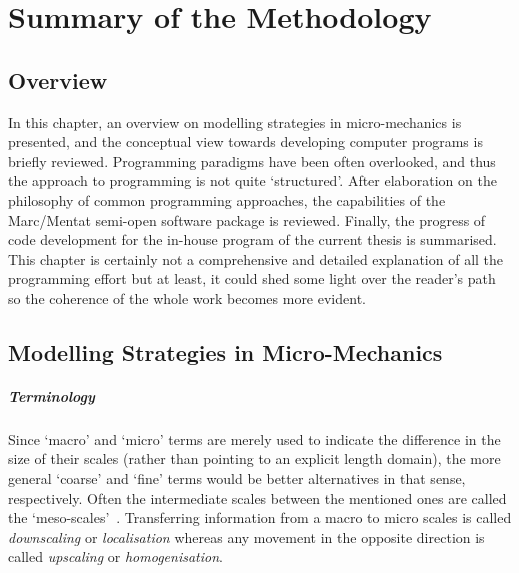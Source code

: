 
\chapter{Summary of the Methodology}\label{chap:method}
\red
\section{Overview}
	In this chapter, an overview on modelling strategies in micro-mechanics is presented, and the conceptual view towards developing computer programs is briefly reviewed. Programming paradigms have been often overlooked, and thus the approach to programming is not quite `structured'. After elaboration on the philosophy of common programming approaches, the capabilities of the Marc/Mentat semi-open software package is reviewed. Finally, the progress of code development for the in-house program of the current thesis is summarised. This chapter is certainly not a comprehensive and detailed explanation of all the programming effort but at least, it could shed some light over the reader's path so the coherence of the whole work becomes more evident.

\section{Modelling Strategies in Micro-Mechanics}
	\paragraph{Terminology} Since `macro' and `micro' terms are merely used to indicate the difference in the size of their scales (rather than pointing to an explicit length domain), the more general `coarse' and `fine' terms would be better alternatives in that sense, respectively. Often the intermediate scales between the mentioned ones are called the `meso-scales'~\autocite{Bohm.2020}. Transferring information from a macro to micro scales is called \textit{downscaling} or \textit{localisation} whereas any movement in the opposite direction is called \textit{upscaling} or \textit{homogenisation}. 

